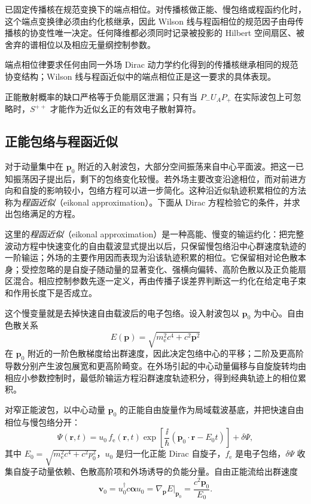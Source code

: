  已固定传播核在规范变换下的端点相位。对传播核做正能、慢包络或程函约化时，这个端点变换律必须由约化核继承，因此 Wilson 线与程函相位的规范因子由母传播核的协变性唯一决定。任何降维都必须同时记录被投影的 Hilbert 空间扇区、被舍弃的谱相位以及相应无量纲控制参数。

端点相位律要求任何由同一外场 Dirac 动力学约化得到的传播核继承相同的规范协变结构；Wilson 线与程函近似中的端点相位正是这一要求的具体表现。

正能散射概率的缺口严格等于负能扇区泄漏；只有当 $P_-U_AP_+$ 在实际波包上可忽略时，$S^{++}$ 才能作为近似幺正的有效电子散射算符。

\subsection{正能包络与程函近似}

对于动量集中在 $\mathbf p_0$ 附近的入射波包，大部分空间振荡来自中心平面波。把这一已知振荡因子提出后，剩下的包络变化较慢。若外场主要改变沿途相位，而对前进方向和自旋的影响较小，包络方程可以进一步简化。这种沿近似轨迹积累相位的方法称为\emph{程函近似}（eikonal approximation）。下面从 Dirac 方程检验它的条件，并求出包络满足的方程。

这里的\emph{程函近似}（eikonal approximation）是一种高能、慢变的输运约化：把完整波动方程中快速变化的自由载波显式提出以后，只保留慢包络沿中心群速度轨迹的一阶输运；外场的主要作用因而表现为沿该轨迹积累的相位。它保留相对论色散本身；受控忽略的是自旋子随动量的显著变化、强横向偏转、高阶色散以及正负能扇区混合。相应控制参数先逐一定义，再由传播子误差界判断这一约化在给定电子束和作用长度下是否成立。

这个慢变量就是去掉快速自由载波后的电子包络。设入射波包以 $\mathbf p_0$ 为中心。自由色散关系
\[
E(\mathbf p)=\sqrt{m_{\mathrm e}^2c^4+c^2\mathbf p^2}
\]
在 $\mathbf p_0$ 附近的一阶色散梯度给出群速度，因此决定包络中心的平移；二阶及更高阶导数分别产生波包展宽和更高阶畸变。在外场引起的中心动量偏移与自旋旋转均由相应小参数控制时，最低阶输运方程沿群速度轨迹积分，得到经典轨迹上的相位累积。

对窄正能波包，以中心动量 $\mathbf p_0$ 的正能自由旋量作为局域载波基底，并把快速自由相位与慢包络分开：
\begin{equation*}
\Psi(\mathbf r,t)
=u_0\,f_{\mathrm e}(\mathbf r,t)
\exp\!\left[\frac{\ii}{\hbar}(\mathbf p_0\cdot\mathbf r-E_0t)\right]
+\delta\Psi,
\end{equation*}
其中 $E_0=\sqrt{m_{\mathrm e}^2c^4+c^2p_0^2}$，$u_0$ 是归一化正能 Dirac 自旋子，$f_{\mathrm e}$ 是电子包络，$\delta\Psi$ 收集自旋子动量依赖、色散高阶项和外场诱导的负能分量。自由正能流给出群速度
\begin{equation*}
\mathbf v_0=u_0^\dagger c\boldsymbol\alpha u_0
=\nabla_{\mathbf p}E|_{\mathbf p_0}
=\frac{c^2\mathbf p_0}{E_0}.
\end{equation*}

